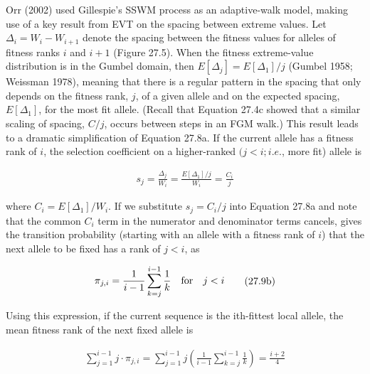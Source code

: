 \documentclass{article}
\begin{document}
Orr (2002) used Gillespie’s SSWM process as an adaptive-walk model, making use of a key result from EVT on the spacing between extreme values. Let  $ \Delta_i = W_i - W_{i+1} $ denote the spacing between the fitness values for alleles of fitness ranks  $ i $ and  $ i+1 $ (Figure 27.5). When the fitness extreme-value distribution is in the Gumbel domain, then  $ E[\Delta_j] = E[\Delta_1]/j $ (Gumbel 1958; Weissman 1978), meaning that there is a regular pattern in the spacing that only depends on the fitness rank,  $ j $, of a given allele and on the expected spacing,  $ E[\Delta_1] $, for the most fit allele. (Recall that Equation 27.4c showed that a similar scaling of spacing,  $ C/j $, occurs between steps in an FGM walk.) This result leads to a dramatic simplification of Equation 27.8a. If the current allele has a fitness rank of  $ i $, the selection coefficient on a higher-ranked  $ (j < i; i.e. $, more fit) allele is

\begin{equation}
\begin{align*}s_j=\frac{\Delta_j}{W_i}=\frac{E[\Delta_1]/j}{W_i}=\frac{C_i}{j}\end{align*}
\tag{27.9a}
\label{eq:27_9a}
\end{equation}

where  $ C_i = E[\Delta_1]/W_i $. If we substitute  $ s_j = C_i/j $ into Equation 27.8a and note that the common  $ C_i $ term in the numerator and denominator terms cancels, gives the transition probability (starting with an allele with a fitness rank of  $ i $) that the next allele to be fixed has a rank of  $ j < i $, as

\begin{equation}
\begin{align*}\pi_{j,i}=\frac{1}{i-1}\sum\limits_{k=j}^{i-1}\frac{1}{k}\quad{\rm for}\quad j<i\end{align*}
\tag{27.9b}
\label{eq:27_9b}
\end{equation}

Using this expression, if the current sequence is the ith-fittest local allele, the mean fitness rank of the next fixed allele is

\begin{equation}
\begin{align*}\sum_{j=1}^{i-1}j\cdot\pi_{j,i}=\sum_{j=1}^{i-1}j\left(\frac{1}{i-1}\sum_{k=j}^{i-1}\frac{1}{k}\right)=\frac{i+2}{4}\end{align*}
\tag{27.9c}
\label{eq:27_9c}
\end{equation}
\end{document}
